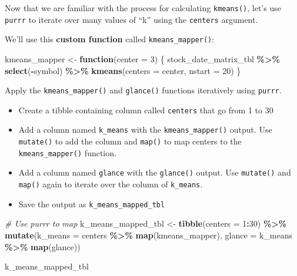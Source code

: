 \documentclass[
]{article}
\newenvironment{Shaded}{\begin{snugshade}}{\end{snugshade}}
\newcommand{\AttributeTok}[1]{\textcolor[rgb]{0.13,0.29,0.53}{#1}}
\newcommand{\CommentTok}[1]{\textcolor[rgb]{0.56,0.35,0.01}{\textit{#1}}}
\newcommand{\ControlFlowTok}[1]{\textcolor[rgb]{0.13,0.29,0.53}{\textbf{#1}}}
\newcommand{\DecValTok}[1]{\textcolor[rgb]{0.00,0.00,0.81}{#1}}
\newcommand{\FunctionTok}[1]{\textcolor[rgb]{0.13,0.29,0.53}{\textbf{#1}}}
\newcommand{\NormalTok}[1]{#1}
\newcommand{\OtherTok}[1]{\textcolor[rgb]{0.56,0.35,0.01}{#1}}
\newcommand{\SpecialCharTok}[1]{\textcolor[rgb]{0.81,0.36,0.00}{\textbf{#1}}}
\providecommand{\tightlist}{%
  \setlength{\itemsep}{0pt}\setlength{\parskip}{0pt}}
\begin{document}
Now that we are familiar with the process for calculating
\texttt{kmeans()}, let's use \texttt{purrr} to iterate over many values
of ``k'' using the \texttt{centers} argument.

We'll use this \textbf{custom function} called
\texttt{kmeans\_mapper()}:

\begin{Shaded}
\begin{Highlighting}[]
\NormalTok{kmeans\_mapper }\OtherTok{\textless{}{-}} \ControlFlowTok{function}\NormalTok{(}\AttributeTok{center =} \DecValTok{3}\NormalTok{) \{}
\NormalTok{    stock\_date\_matrix\_tbl }\SpecialCharTok{\%\textgreater{}\%}
        \FunctionTok{select}\NormalTok{(}\SpecialCharTok{{-}}\NormalTok{symbol) }\SpecialCharTok{\%\textgreater{}\%}
        \FunctionTok{kmeans}\NormalTok{(}\AttributeTok{centers =}\NormalTok{ center, }\AttributeTok{nstart =} \DecValTok{20}\NormalTok{)}
\NormalTok{\}}
\end{Highlighting}
\end{Shaded}

Apply the \texttt{kmeans\_mapper()} and \texttt{glance()} functions
iteratively using \texttt{purrr}.

\begin{itemize}
\tightlist
\item
  Create a tibble containing column called \texttt{centers} that go from
  1 to 30
\item
  Add a column named \texttt{k\_means} with the
  \texttt{kmeans\_mapper()} output. Use \texttt{mutate()} to add the
  column and \texttt{map()} to map centers to the
  \texttt{kmeans\_mapper()} function.
\item
  Add a column named \texttt{glance} with the \texttt{glance()} output.
  Use \texttt{mutate()} and \texttt{map()} again to iterate over the
  column of \texttt{k\_means}.
\item
  Save the output as \texttt{k\_means\_mapped\_tbl}
\end{itemize}

\begin{Shaded}
\begin{Highlighting}[]
\CommentTok{\# Use purrr to map}
\NormalTok{k\_means\_mapped\_tbl }\OtherTok{\textless{}{-}} \FunctionTok{tibble}\NormalTok{(}\AttributeTok{centers =} \DecValTok{1}\SpecialCharTok{:}\DecValTok{30}\NormalTok{) }\SpecialCharTok{\%\textgreater{}\%} 
    \FunctionTok{mutate}\NormalTok{(}\AttributeTok{k\_means =}\NormalTok{ centers }\SpecialCharTok{\%\textgreater{}\%} \FunctionTok{map}\NormalTok{(kmeans\_mapper),}
           \AttributeTok{glance =}\NormalTok{ k\_means }\SpecialCharTok{\%\textgreater{}\%} \FunctionTok{map}\NormalTok{(glance))}


\NormalTok{k\_means\_mapped\_tbl}
\end{Highlighting}
\end{Shaded}
\end{document}
